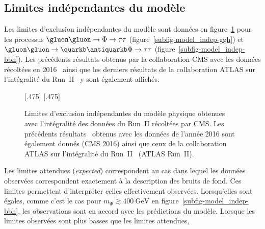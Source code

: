 \subsection{Limites indépendantes du modèle}
Les limites d'exclusion indépendantes du modèle sont données en figure~\ref{fig-model_indep}
pour les processus
$\gluon\gluon\to\Phi\to\tau\tau$ (figure~\ref{subfig-model_indep-ggh})
et
$\gluon\gluon\to\quarkb\antiquarkb\Phi\to\tau\tau$ (figure~\ref{subfig-model_indep-bbh}).
Les précédents résultats obtenus par la collaboration CMS avec les données récoltées en 2016~\cite{CMS-PAS-HIG-17-020}
ainsi que les derniers résultats de la collaboration ATLAS sur l'intégralité du Run~II~\cite{ATLAS-MSSM-HTT_2020} y sont également affichés.
\begin{figure}[h]
\centering

[.475\textwidth]
{}
\hfill
{}[.475\textwidth]
{}


\caption[Limites d'exclusion indépendantes.]{Limites d'exclusion indépendantes du modèle physique obtenues avec l'intégralité des données du Run~II récoltées par CMS. Les précédents résultats~\cite{CMS-PAS-HIG-17-020} obtenus avec les données de l'année 2016 sont également donnés (CMS 2016) ainsi que ceux de la collaboration ATLAS sur l'intégralité du Run~II~\cite{ATLAS-MSSM-HTT_2020} (ATLAS Run~II).}
\label{fig-model_indep}
\end{figure}
\par
Les limites attendues (\emph{expected}) correspondent au cas dans lequel
les données observées correspondent exactement à la description des bruits de fond.
Ces limites permettent d'interpréter celles effectivement observées.
Lorsqu'elles sont égales,
comme c'est le cas pour $m_{\Phi}\gtrsim\SI{400}{\GeV}$ en figure~\ref{subfig-model_indep-bbh},
les observations sont en accord avec les prédictions du modèle.
Lorsque les limites observées sont plus basses que les limites attendues,
